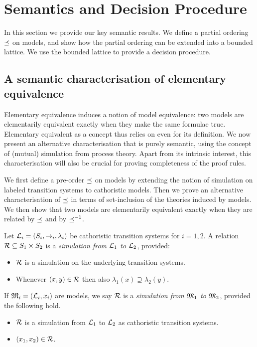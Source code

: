 \section{Semantics and Decision Procedure}\label{elAndBangCore}

In this section we provide our key semantic results. 
We define a partial ordering $\preceq$ on models, and show how the partial ordering can be extended into a bounded lattice.
We use the bounded lattice to provide a decision procedure.

\subsection{A semantic characterisation of elementary equivalence}\label{elementaryEquivalence}

Elementary equivalence induces a notion of model equivalence: two
models are elementarily equivalent exactly when they make the same
formulae true. Elementary equivalent as a concept thus relies on
\cathoristic{} even for its definition. We now present an alternative
characterisation that is purely semantic, using the concept of
(mutual) simulation from process theory. Apart from its intrinsic
interest, this characterisation will also be crucial for proving
completeness of the proof rules.

We first define a pre-order $\preceq$ on models by extending the
notion of simulation on labeled transition systems to cathoristic
models. Then we prove an alternative characterisation of $\preceq$
in terms of set-inclusion of the theories induced by models. We then
show that two models are elementarily equivalent exactly when they are
related by $\preceq$ and by $\preceq^{-1}$.

\begin{definition}
Let $\mathcal{L}_i = (S_i, \rightarrow_i, \lambda_i)$ be cathoristic transition
systems for $i = 1, 2$.  A relation $\mathcal{R} \subseteq S_1 \times S_2$ is
a \emph{simulation from $\mathcal{L}_1$ to $\mathcal{L}_2$}, provided:
\begin{itemize} 

\item $\mathcal{R}$ is a simulation on the underlying transition systems. 

\item Whenever $(x, y) \in \mathcal{R}$ then also $\lambda_1(x) \supseteq
  \lambda_2(y)$.

\end{itemize}

\NI If $\frak{M}_i = (\mathcal{L}_i, x_i)$ are models, we say $\mathcal{R}$ is a
\emph{simulation from $\frak{M}_1$ to $\frak{M}_2$}, provided the following hold.

\begin{itemize}

\item $\mathcal{R}$ is a simulation from $\mathcal{L}_1$ to $\mathcal{L}_2$ as cathoristic transition systems.

\item  $(x_1, x_2) \in \mathcal{R}$. 

\end{itemize}

\end{definition}

